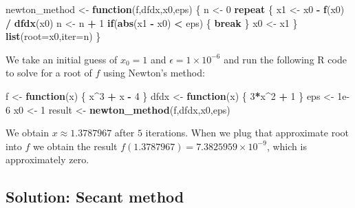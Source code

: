 \documentclass[
  10pt,
  twocolumn]{article}
\newenvironment{Shaded}{\begin{snugshade}}{\end{snugshade}}
\newcommand{\AttributeTok}[1]{\textcolor[rgb]{0.13,0.29,0.53}{#1}}
\newcommand{\ControlFlowTok}[1]{\textcolor[rgb]{0.13,0.29,0.53}{\textbf{#1}}}
\newcommand{\DecValTok}[1]{\textcolor[rgb]{0.00,0.00,0.81}{#1}}
\newcommand{\FloatTok}[1]{\textcolor[rgb]{0.00,0.00,0.81}{#1}}
\newcommand{\FunctionTok}[1]{\textcolor[rgb]{0.13,0.29,0.53}{\textbf{#1}}}
\newcommand{\NormalTok}[1]{#1}
\newcommand{\OtherTok}[1]{\textcolor[rgb]{0.56,0.35,0.01}{#1}}
\newcommand{\SpecialCharTok}[1]{\textcolor[rgb]{0.81,0.36,0.00}{\textbf{#1}}}
\begin{document}
\begin{Shaded}
\begin{Highlighting}[]
\NormalTok{newton\_method }\OtherTok{\textless{}{-}} \ControlFlowTok{function}\NormalTok{(f,dfdx,x0,eps)}
\NormalTok{\{}
\NormalTok{  n }\OtherTok{\textless{}{-}} \DecValTok{0}
  \ControlFlowTok{repeat}
\NormalTok{  \{}
\NormalTok{    x1 }\OtherTok{\textless{}{-}}\NormalTok{ x0 }\SpecialCharTok{{-}} \FunctionTok{f}\NormalTok{(x0) }\SpecialCharTok{/} \FunctionTok{dfdx}\NormalTok{(x0)}
\NormalTok{    n }\OtherTok{\textless{}{-}}\NormalTok{ n }\SpecialCharTok{+} \DecValTok{1}
    \ControlFlowTok{if}\NormalTok{(}\FunctionTok{abs}\NormalTok{(x1 }\SpecialCharTok{{-}}\NormalTok{ x0) }\SpecialCharTok{\textless{}}\NormalTok{ eps)}
\NormalTok{    \{}
      \ControlFlowTok{break}
\NormalTok{    \}}
\NormalTok{    x0 }\OtherTok{\textless{}{-}}\NormalTok{ x1}
\NormalTok{  \}}
  \FunctionTok{list}\NormalTok{(}\AttributeTok{root=}\NormalTok{x0,}\AttributeTok{iter=}\NormalTok{n)}
\NormalTok{\}}
\end{Highlighting}
\end{Shaded}

We take an initial guess of \(x_0 = 1\) and
\(\epsilon = 1 \times 10^{-6}\) and run the following R code to solve
for a root of \(f\) using Newton's method:

\begin{Shaded}
\begin{Highlighting}[]
\NormalTok{f }\OtherTok{\textless{}{-}} \ControlFlowTok{function}\NormalTok{(x) \{ x}\SpecialCharTok{\^{}}\DecValTok{3} \SpecialCharTok{+}\NormalTok{ x }\SpecialCharTok{{-}} \DecValTok{4}\NormalTok{ \}}
\NormalTok{dfdx }\OtherTok{\textless{}{-}} \ControlFlowTok{function}\NormalTok{(x) \{ }\DecValTok{3}\SpecialCharTok{*}\NormalTok{x}\SpecialCharTok{\^{}}\DecValTok{2} \SpecialCharTok{+} \DecValTok{1}\NormalTok{ \}}
\NormalTok{eps }\OtherTok{\textless{}{-}} \FloatTok{1e{-}6}
\NormalTok{x0 }\OtherTok{\textless{}{-}} \DecValTok{1}
\NormalTok{result }\OtherTok{\textless{}{-}} \FunctionTok{newton\_method}\NormalTok{(f,dfdx,x0,eps)}
\end{Highlighting}
\end{Shaded}

We obtain \(x \approx 1.3787967\) after \(5\) iterations. When we plug
that approximate root into \(f\) we obtain the result
\(f(1.3787967) = \ensuremath{7.3825959\times 10^{-9}}\), which is
approximately zero.

\hypertarget{solution-secant-method}{%
\subsection{Solution: Secant method}\label{solution-secant-method}}
\end{document}
